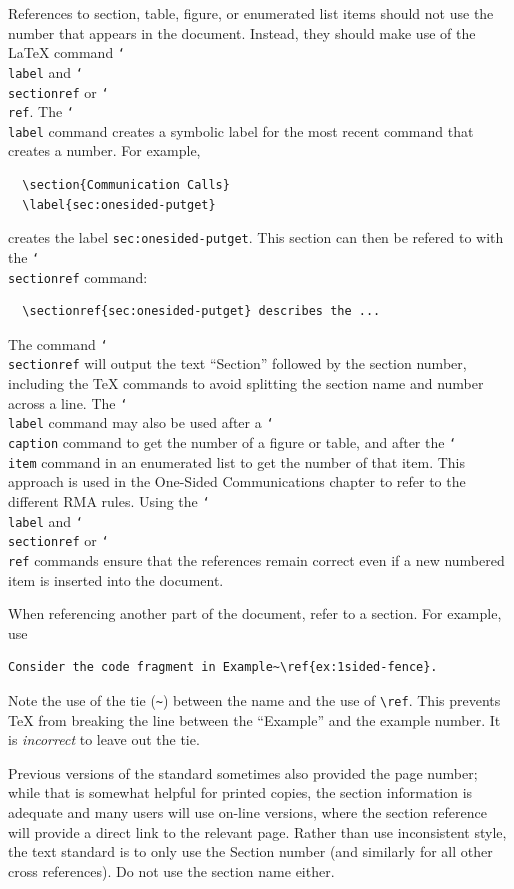 \documentclass[letterpaper,twoside,11pt,fleqn]{article}
\def\cmd#1{\texttt{\char`\\#1}}
\begin{document}
References to section, table, figure, or enumerated list items should
not use the number that appears in the document.  Instead, they should
make use of the LaTeX command \cmd{label} and \cmd{sectionref} or
\cmd{ref}.  The
\cmd{label} command creates a symbolic label for the most recent
command that creates a number.  For example,
\begin{verbatim}
  \section{Communication Calls}
  \label{sec:onesided-putget}
\end{verbatim}
creates the label \texttt{sec:onesided-putget}.  This section can then
be refered to with the \cmd{sectionref} command:
\begin{verbatim}
  \sectionref{sec:onesided-putget} describes the ...
\end{verbatim}
The command \cmd{sectionref} will output the text ``Section'' followed
by the section number, including the TeX commands to avoid splitting
the section name and number across a line.
The \cmd{label} command may also be used after a \cmd{caption} command
to get the number of a figure or table, and after the \cmd{item}
command in an enumerated list to get the number of that item.  This
approach is used in the One-Sided Communications chapter to refer to
the different RMA rules.  Using the \cmd{label} and \cmd{sectionref} or
\cmd{ref} commands
ensure that the references remain correct even if a new numbered item
is inserted into the document.

When referencing another part of the document, refer to a section.
For example, use
\begin{verbatim}
Consider the code fragment in Example~\ref{ex:1sided-fence}.
\end{verbatim}
Note the use of the tie (\verb+~+) between the name and the use of
\verb+\ref+. This prevents TeX from breaking the line between the
``Example'' and the example number.  It is \emph{incorrect} to leave
out the tie.

Previous versions of the standard sometimes also provided the page
number; while that is somewhat helpful for printed copies, the section
information is adequate and many users will use on-line versions,
where the section reference will provide a direct link to the relevant
page.  Rather than use inconsistent style, the text standard is to
only use the Section number (and similarly for all other cross
references).
Do not use the section name either.
\end{document}
